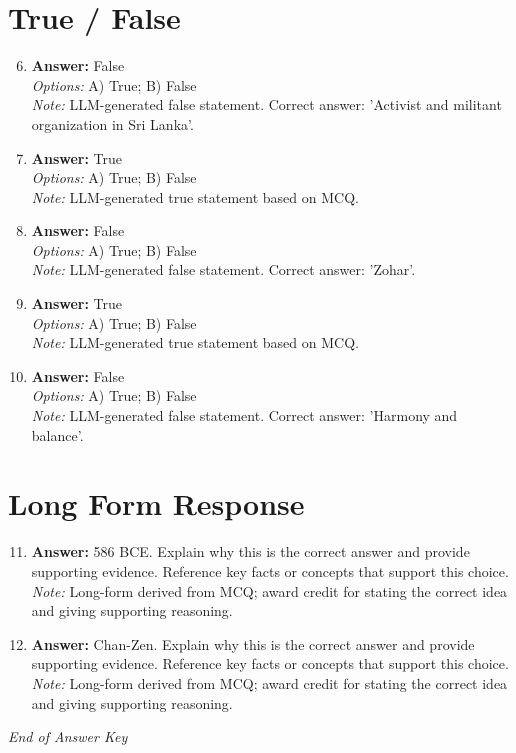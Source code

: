 \documentclass[12pt]{article}
\begin{document}
\section*{True / False}
\begin{enumerate}[label=\arabic*.]
\setcounter{enumi}{5}
\item \textbf{Answer:} False
\\ \textit{Options:} A) True; B) False
\\ \textit{Note:} LLM-generated false statement. Correct answer: 'Activist and militant organization in Sri Lanka'.
\item \textbf{Answer:} True
\\ \textit{Options:} A) True; B) False
\\ \textit{Note:} LLM-generated true statement based on MCQ.
\item \textbf{Answer:} False
\\ \textit{Options:} A) True; B) False
\\ \textit{Note:} LLM-generated false statement. Correct answer: 'Zohar'.
\item \textbf{Answer:} True
\\ \textit{Options:} A) True; B) False
\\ \textit{Note:} LLM-generated true statement based on MCQ.
\item \textbf{Answer:} False
\\ \textit{Options:} A) True; B) False
\\ \textit{Note:} LLM-generated false statement. Correct answer: 'Harmony and balance'.
\end{enumerate}

\section*{Long Form Response}
\begin{enumerate}[label=\arabic*.]
\setcounter{enumi}{10}
\item \textbf{Answer:} 586 BCE. Explain why this is the correct answer and provide supporting evidence. Reference key facts or concepts that support this choice.
\\ \textit{Note:} Long-form derived from MCQ; award credit for stating the correct idea and giving supporting reasoning.
\item \textbf{Answer:} Chan-Zen. Explain why this is the correct answer and provide supporting evidence. Reference key facts or concepts that support this choice.
\\ \textit{Note:} Long-form derived from MCQ; award credit for stating the correct idea and giving supporting reasoning.
\end{enumerate}

\vfill
\noindent\textit{End of Answer Key}
\end{document}
